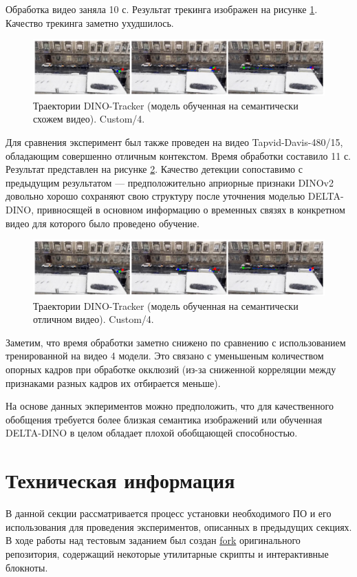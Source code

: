 \documentclass[a4paper, 14pt]{extarticle}
\theoremstyle{definition}
\theoremstyle{plain}
\theoremstyle{remark}
\begin{document}
Обработка видео заняла 10 с. Результат трекинга изображен на рисунке \ref{fig:custom-4-sem}. Качество трекинга заметно ухудшилось.
\begin{figure}
    [H]
    \centering
    \includegraphics[width=\textwidth]{figs/custom-4-sem.png}
    \caption{Траектории DINO-Tracker (модель обученная на семантически схожем видео). Custom/4.}
    \label{fig:custom-4-sem}
\end{figure}

Для сравнения эксперимент был также проведен на видео Tapvid-Davis-480/15, обладающим совершенно отличным контекстом. Время обработки составило 11 с. Результат представлен на рисунке \ref{fig:custom-4-bad-sem}. Качество детекции сопоставимо с предыдущим результатом --- предположительно априорные признаки DINOv2 довольно хорошо сохраняют свою структуру после уточнения моделью DELTA-DINO, привносящей в основном информацию о временных связях в конкретном видео для которого было проведено обучение.
\begin{figure}
    [H]
    \centering
    \includegraphics[width=\textwidth]{figs/custom-4-bad-sem.png}
    \caption{Траектории DINO-Tracker (модель обученная на семантически отличном видео). Custom/4.}
    \label{fig:custom-4-bad-sem}
\end{figure}

Заметим, что время обработки заметно снижено по сравнению с использованием тренированной на видео 4 модели. Это связано с уменьшеным количеством опорных кадров при обработке окклюзий (из-за сниженной корреляции между признаками разных кадров их отбирается меньше).

На основе данных экпериментов можно предположить, что для качественного обобщения требуется более близкая семантика изображений или обученная DELTA-DINO в целом обладает плохой обобщающей способностью.

\newpage


\section{Техническая информация} 
В данной секции рассматривается процесс установки необходимого ПО и его использования для проведения экспериментов, описанных в предыдущих секциях. В ходе работы над тестовым заданием был создан \href{https://github.com/diuzhevVlad/dino-tracker-assignment.git}{fork} оригинального репозитория, содержащий некоторые утилитарные скрипты и интерактивные блокноты. 
\end{document}

